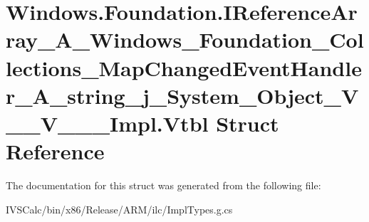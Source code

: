 \hypertarget{struct_windows_1_1_foundation_1_1_i_reference_array___a___windows___foundation___collections___m61cf829dcb9285643f33c32c5687b5e6}{}\section{Windows.\+Foundation.\+I\+Reference\+Array\+\_\+\+A\+\_\+\+Windows\+\_\+\+Foundation\+\_\+\+Collections\+\_\+\+Map\+Changed\+Event\+Handler\+\_\+\+A\+\_\+string\+\_\+j\+\_\+\+System\+\_\+\+Object\+\_\+\+V\+\_\+\+\_\+\+V\+\_\+\+\_\+\+\_\+\+Impl.\+Vtbl Struct Reference}
\label{struct_windows_1_1_foundation_1_1_i_reference_array___a___windows___foundation___collections___m61cf829dcb9285643f33c32c5687b5e6}


The documentation for this struct was generated from the following file\+:\begin{DoxyCompactItemize}
\item 
I\+V\+S\+Calc/bin/x86/\+Release/\+A\+R\+M/ilc/Impl\+Types.\+g.\+cs\end{DoxyCompactItemize}
